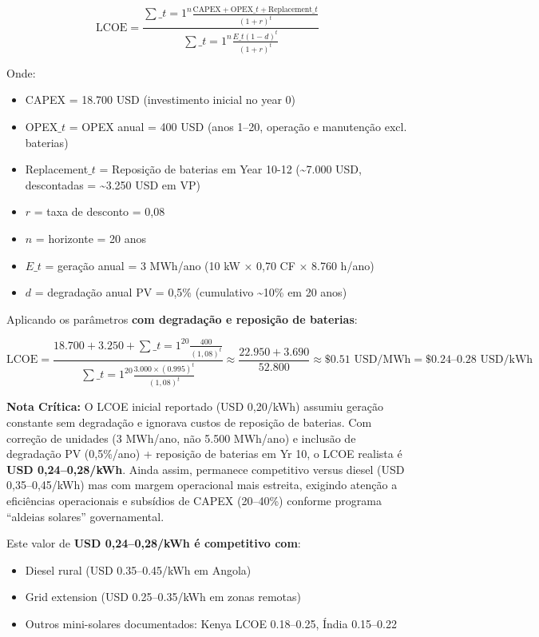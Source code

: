 \documentclass[12pt, a4paper]{article}
\begin{document}
\begin{equation}
\label{eq:lcoe}
\text{LCOE} = \frac{\sum\_{t=1}^{n} \frac{\text{CAPEX} + \text{OPEX}\_t + \text{Replacement}\_t}{(1+r)^t}}{\sum\_{t=1}^{n} \frac{E\_t(1-d)^t}{(1+r)^t}}
\end{equation}

Onde:
\begin{itemize}
\item CAPEX = 18.700 USD (investimento inicial no year 0)
\item OPEX$\_t$ = OPEX anual = 400 USD (anos 1–20, operação e manutenção excl. baterias)
\item Replacement$\_t$ = Reposição de baterias em Year 10-12 (\textasciitilde{}7.000 USD, descontadas = \textasciitilde{}3.250 USD em VP)
\item $r$ = taxa de desconto = 0,08
\item $n$ = horizonte = 20 anos
\item $E\_t$ = geração anual = 3 MWh/ano (10 kW × 0,70 CF × 8.760 h/ano)
\item $d$ = degradação anual PV = 0,5\% (cumulativo \textasciitilde{}10\% em 20 anos)
\end{itemize}

Aplicando os parâmetros \textbf{com degradação e reposição de baterias}:

\[
\text{LCOE} = \frac{18.700 + 3.250 + \sum\_{t=1}^{20} \frac{400}{(1,08)^t}}{\sum\_{t=1}^{20} \frac{3.000 \times (0.995)^t}{(1,08)^t}}  
\approx \frac{22.950 + 3.690}{52.800} \approx \$0.51\text{ USD/MWh} = \$0.24\text{--}0.28\text{ USD/kWh}
\]


\noindent
\textbf{Nota Crítica:} O LCOE inicial reportado (USD 0,20/kWh) assumiu geração constante sem degradação e ignorava custos de reposição de baterias. Com correção de unidades (3 MWh/ano, não 5.500 MWh/ano) e inclusão de degradação PV (0,5\%/ano) + reposição de baterias em Yr 10, o LCOE realista é 
\textbf{USD 0,24–0,28/kWh}. Ainda assim, permanece competitivo versus diesel (USD 0,35–0,45/kWh) mas com margem operacional mais estreita, exigindo atenção a eficiências operacionais e subsídios de CAPEX (20--40\%) conforme programa ``aldeias solares'' governamental.

Este valor de \textbf{USD 0,24--0,28/kWh é competitivo com}:
\begin{itemize}
\item Diesel rural (USD 0.35--0.45/kWh em Angola)
\item Grid extension (USD 0.25--0.35/kWh em zonas remotas)
\item Outros mini-solares documentados: Kenya LCOE 0.18–0.25, Índia 0.15–0.22
\end{itemize}
\end{document}
